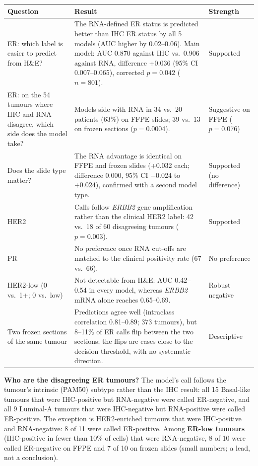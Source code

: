 \documentclass[10pt,a4paper]{article}
\begin{document}
{\small
\renewcommand{\arraystretch}{1.15}
\noindent
\begin{tabularx}{\textwidth}{@{}p{3.6cm}Lp{2.3cm}@{}}
\toprule
\textbf{Question} & \textbf{Result} & \textbf{Strength} \\
\midrule
ER: which label is easier to predict from H\&E? &
  The RNA-defined ER status is predicted better than IHC ER status by all 5 models (AUC higher by 0.02--0.06). Main
  model: AUC 0.870 against IHC vs.\ 0.906 against RNA, difference +0.036 (95\% CI 0.007--0.065), corrected $p = 0.042$
  ($n = 801$). &
  Supported \\
ER: on the 54 tumours where IHC and RNA disagree, which side does the model take? &
  Models side with RNA in 34 vs.\ 20 patients (63\%) on FFPE slides; 39 vs.\ 13 on frozen sections ($p = 0.0004$). &
  Suggestive on FFPE ($p = 0.076$) \\
Does the slide type matter? &
  The RNA advantage is identical on FFPE and frozen slides (+0.032 each; difference 0.000, 95\% CI $-0.024$ to $+0.024$),
  confirmed with a second model type. &
  Supported (no difference) \\
HER2 &
  Calls follow \emph{ERBB2} gene amplification rather than the clinical HER2 label: 42 vs.\ 18 of 60 disagreeing
  tumours ($p = 0.003$). &
  Supported \\
PR &
  No preference once RNA cut-offs are matched to the clinical positivity rate (67 vs.\ 66). &
  No preference \\
HER2-low (0 vs.\ 1+; 0 vs.\ low) &
  Not detectable from H\&E: AUC 0.42--0.54 in every model, whereas \emph{ERBB2} mRNA alone reaches 0.65--0.69. &
  Robust negative \\
Two frozen sections of the same tumour &
  Predictions agree well (intraclass correlation 0.81--0.89; 373 tumours), but 8--11\% of ER calls flip between the two sections;
  the flips are cases close to the decision threshold, with no systematic direction. &
  Descriptive \\
\bottomrule
\end{tabularx}
\par}

\textbf{Who are the disagreeing ER tumours?} The model's call follows the tumour's intrinsic (PAM50) subtype rather than the
IHC result: all 15 Basal-like tumours that were IHC-positive but RNA-negative were called ER-negative, and all 9
Luminal-A tumours that were IHC-negative but RNA-positive were called ER-positive. The exception is HER2-enriched tumours
that were IHC-positive and RNA-negative: 8 of 11 were called ER-positive. Among \textbf{ER-low tumours} (IHC-positive in
fewer than 10\% of cells) that were RNA-negative, 8 of 10 were called ER-negative on FFPE and 7 of 10 on frozen slides (small numbers; a lead,
not a conclusion).
\end{document}
